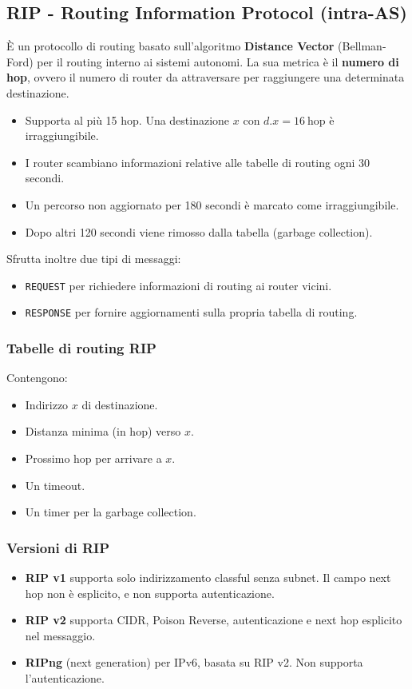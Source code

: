 \subsection{RIP - Routing Information Protocol (intra-AS)}
È un protocollo di routing basato sull'algoritmo \textbf{Distance Vector} (Bellman-Ford) per il routing interno ai sistemi autonomi. La sua metrica è il \textbf{numero di hop}, ovvero il numero di router da attraversare per raggiungere una determinata destinazione.
\begin{itemize}
	\item Supporta al più 15 hop. Una destinazione $x$ con $d.x=16 \ \text{hop}$ è irraggiungibile.
	\item I router scambiano informazioni relative alle tabelle di routing ogni 30 secondi.
	\item Un percorso non aggiornato per 180 secondi è marcato come irraggiungibile.
	\item Dopo altri 120 secondi viene rimosso dalla tabella (garbage collection).
\end{itemize}
Sfrutta inoltre due tipi di messaggi:
\begin{itemize}
	\item \verb|REQUEST| per richiedere informazioni di routing ai router vicini.
	\item \verb|RESPONSE| per fornire aggiornamenti sulla propria tabella di routing.
\end{itemize}
\subsubsection{Tabelle di routing RIP}
Contengono:
\begin{itemize}
	\item Indirizzo $x$ di destinazione.
	\item Distanza minima (in hop) verso $x$.
	\item Prossimo hop per arrivare a $x$.
	\item Un timeout.
	\item Un timer per la garbage collection.
\end{itemize}

\subsubsection{Versioni di RIP}
\begin{itemize}
	\item \textbf{RIP v1} supporta solo indirizzamento classful senza subnet. Il campo next hop non è esplicito, e non supporta autenticazione.
	\item \textbf{RIP v2} supporta CIDR, Poison Reverse, autenticazione e next hop esplicito nel messaggio.
	\item \textbf{RIPng} (next generation) per IPv6, basata su RIP v2. Non supporta l'autenticazione.
\end{itemize}


